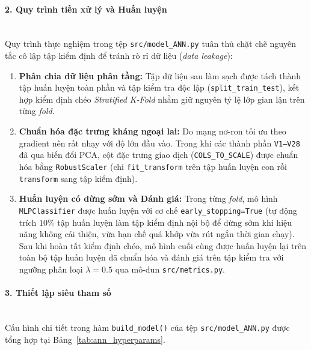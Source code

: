 \paragraph{2. Quy trình tiền xử lý và Huấn luyện}\mbox{}\\
Quy trình thực nghiệm trong tệp \texttt{src/model\_ANN.py} tuân thủ chặt chẽ nguyên tắc cô lập tập kiểm định để tránh rò rỉ dữ liệu (\textit{data leakage}):
\begin{enumerate}
    \item \textbf{Phân chia dữ liệu phân tầng:} Tập dữ liệu sau làm sạch được tách thành tập huấn luyện toàn phần và tập kiểm tra độc lập (\texttt{split\_train\_test}), kết hợp kiểm định chéo \textit{Stratified K-Fold} nhằm giữ nguyên tỷ lệ lớp gian lận trên từng \textit{fold}.
    \item \textbf{Chuẩn hóa đặc trưng kháng ngoại lai:} Do mạng nơ-ron tối ưu theo gradient nên rất nhạy với độ lớn đầu vào. Trong khi các thành phần \texttt{V1--V28} đã qua biến đổi PCA, cột đặc trưng giao dịch (\texttt{COLS\_TO\_SCALE}) được chuẩn hóa bằng \texttt{RobustScaler} (chỉ \texttt{fit\_transform} trên tập huấn luyện con rồi \texttt{transform} sang tập kiểm định).
    \item \textbf{Huấn luyện có dừng sớm và Đánh giá:} Trong từng \textit{fold}, mô hình \texttt{MLPClassifier} được huấn luyện với cơ chế \texttt{early\_stopping=True} (tự động trích $10\%$ tập huấn luyện làm tập kiểm định nội bộ để dừng sớm khi hiệu năng không cải thiện, vừa hạn chế quá khớp vừa rút ngắn thời gian chạy). Sau khi hoàn tất kiểm định chéo, mô hình cuối cùng được huấn luyện lại trên toàn bộ tập huấn luyện đã chuẩn hóa và đánh giá trên tập kiểm tra với ngưỡng phân loại $\lambda = 0.5$ qua mô-đun \texttt{src/metrics.py}.
\end{enumerate}

\paragraph{3. Thiết lập siêu tham số}\mbox{}\\
Cấu hình chi tiết trong hàm \texttt{build\_model()} của tệp \texttt{src/model\_ANN.py} được tổng hợp tại Bảng~\ref{tab:ann_hyperparams}.

